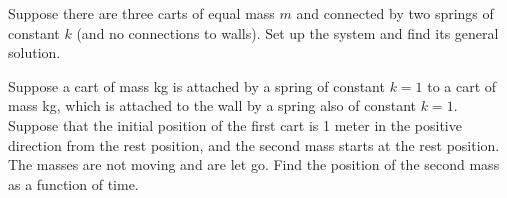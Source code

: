 \begin{exercise}
Suppose there are three carts of equal mass $m$ and connected by two springs of
constant $k$ (and no connections to walls).  Set up the system and find its
general solution.
\end{exercise}

\begin{exercise}
Suppose a cart of mass \unit[2]{kg} is attached by a spring of
constant $k=1$ to a cart of mass \unit[3]{kg}, which
is attached to the wall by a spring also of constant $k=1$.
Suppose that the initial position of the first cart is 1 meter in the
positive direction from the rest position, and the second mass starts at the
rest position.  The masses are not moving and are let go.  Find the
position of the second mass as a function of time.
\end{exercise}

